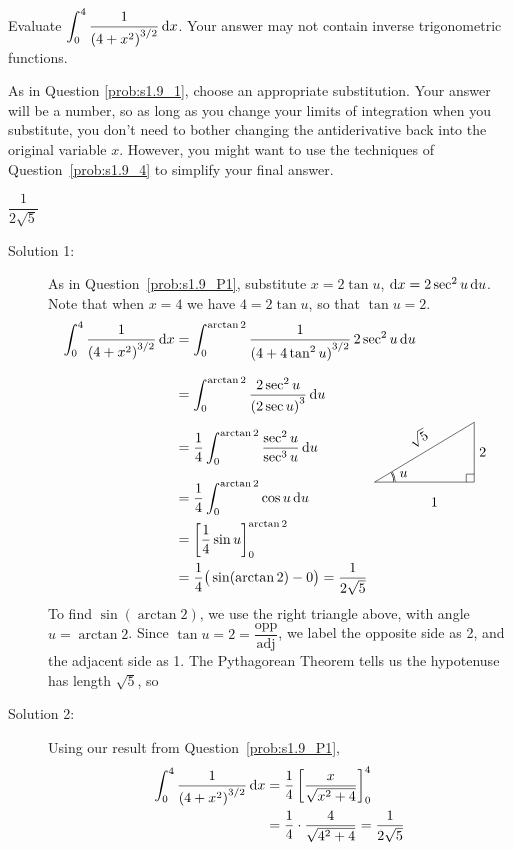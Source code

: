 \begin{question}[2016Q4]
Evaluate
$\displaystyle\int_0^4 \frac{1}{{(4+x^2)}^{3/2}}\,\mathrm{d}x$. 
Your answer may not contain inverse trigonometric functions.
\end{question}
\begin{hint} 
As in Question \ref{prob:s1.9_1}, choose an appropriate substitution. Your answer will be a number, so as long as you change your limits of integration when you substitute, you don't need to bother changing the antiderivative back into the original variable $x$. However, you might want to use the techniques of Question~\ref{prob:s1.9_4} to simplify your final answer.
\end{hint}

\begin{answer} 
$ \dfrac{1}{2\sqrt{5}}$
\end{answer}

\begin{solution} 
\begin{description}
\item[Solution 1:]
As in Question~\ref{prob:s1.9_P1}, substitute $x=2\tan u$,  $\mathrm{d}x=2 \sec^2u\,\mathrm{d}u$. Note that when $x=4$
we have $4=2\tan u$, so that $\tan u=2$.
\begin{align*}
\int_0^4 \frac{1}{{(4+x^2)}^{3/2}}\,\dee{x}
&=\int_0^{\arctan 2} \frac{1}{{(4+4\tan^2 u)}^{3/2}}\,2\sec^2 u\,\dee{u}
   \\[0.1in]
&=\int_0^{\arctan 2} \frac{2\sec^2 u}{{(2\sec u)}^{3}}\,\dee{u}
   \\[0.1in]
&=\frac{1}{4}\int_0^{\arctan 2} \frac{\sec^2u}{\sec^3u}\,\dee{u}\\[0.1in]
&=\frac{1}{4}\int_0^{\arctan 2} \cos u\,\dee{u}
\qquad\qquad\smash{\raisebox{-0.1\height}{
\trigtri{u}{1}{2}{\sqrt{5}}
}}
\\
&=\bigg[\frac{1}{4}\sin u \bigg]_0^{\arctan2}
\\
&=\frac{1}{4} \big( \sin(\arctan 2) - 0 \big)
= \frac{1}{2\sqrt{5}}
\end{align*}
To find $\sin(\arctan 2)$, we use the right triangle above, with angle $u=\arctan 2$. Since $\tan u=2 = \dfrac{\mbox{opp}}{\mbox{adj}}$, we label the opposite side as 2, and the adjacent side as 1. The Pythagorean Theorem tells us the hypotenuse has length $\sqrt{5}$, so 

\item[Solution 2:]
Using our result from Question~\ref{prob:s1.9_P1},
\begin{align*}
\int_0^4 \frac{1}{{(4+x^2)}^{3/2}}\,\mathrm{d}x&=\frac{1}{4}\left[ \dfrac x{\sqrt{x^2+4}}\right]_0^4\\
&=\frac{1}{4}\cdot \dfrac{4}{\sqrt{4^2+4}}=\frac{1}{2\sqrt{5}}
\end{align*}
\end{description}
\end{solution}


